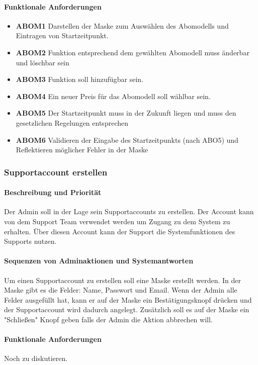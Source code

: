 \paragraph{Funktionale Anforderungen}
\begin{itemize}
	\item \textbf{ABOM1} Darstellen der Maske zum Auswählen des Abomodells und Eintragen von Startzeitpunkt.
	\item \textbf{ABOM2} Funktion entsprechend dem gewählten Abomodell muss änderbar und löschbar sein
	\item \textbf{ABOM3} Funktion soll hinzufügbar sein.
	\item \textbf{ABOM4} Ein neuer Preis für das Abomodell soll wählbar sein.
	\item \textbf{ABOM5} Der Startzeitpunkt muss in der Zukunft liegen und muss den gesetzlichen Regelungen entsprechen
	\item \textbf{ABOM6} Validieren der Eingabe des Startzeitpunkts (nach ABO5) und Reflektieren möglicher Fehler in der Maske
\end{itemize}


\subsubsection{Supportaccount erstellen}
\paragraph{Beschreibung und Priorität}
Der Admin soll in der Lage sein Supportaccounts zu erstellen. Der Account kann von dem Support Team verwendet werden um Zugang zu dem System zu erhalten. Über diesen Account kann der Support die Systemfunktionen des Supports nutzen.
\paragraph{Sequenzen von Adminaktionen und Systemantworten}
Um einen Supportaccount zu erstellen soll eine Maske erstellt werden. In der Maske gibt es die Felder: Name, Passwort und Email. Wenn der Admin alle Felder ausgefüllt hat, kann er auf der Maske ein Bestätigungsknopf drücken und der Supportaccount wird dadurch angelegt. Zusätzlich soll es auf der Maske ein "Schließen" Knopf geben falls der Admin die Aktion abbrechen will.
\paragraph{Funktionale Anforderungen}
Noch zu diskutieren.

